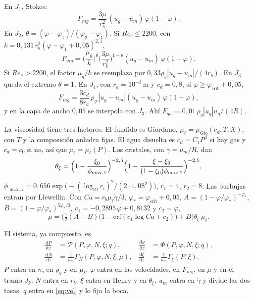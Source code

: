 \documentclass[11pt,a4paper]{article}
\newcommand{\dd}{\,\mathrm{d}}
\begin{document}
En $J_1$, Stokes:
\begin{equation}
\label{eq:Fmg1}
F_{mg}
=\frac{3\mu}{r_b^2}\,(u_g-u_m)\,\varphi(1-\varphi).
\end{equation}
En $J_2$, $\theta=(\varphi-\varphi_1)/(\varphi_2-\varphi_1)$. Si
$Re_b\le 2200$, con
$k=0{,}131\,r_b^2(\varphi-\varphi_1+0{,}05)^{2{,}1}$,
\begin{equation}
\label{eq:Fmg2}
F_{mg}
=\Biggl(\frac{\mu_g}{k}\Biggr)^\theta
\Biggl(\frac{3\mu}{r_b^2}\Biggr)^{1-\theta}
(u_g-u_m)\,\varphi(1-\varphi).
\end{equation}
Si $Re_b>2200$, el factor $\mu_g/k$ se reemplaza por
$0{,}33\rho_g|u_g-u_m|/(4r_b)$. En $J_3$ queda el extremo
$\theta=1$. En $J_4$, con $r_a=10^{-3}\,\mathrm{m}$ y $c_d=0{,}8$,
si $\varphi\ge\varphi_{\mathrm{crit}}+0{,}05$,
\begin{equation}
\label{eq:Fmg4}
F_{mg}
=\frac{3c_d}{8r_a}\,\rho_g\,|u_g-u_m|(u_g-u_m)\,\varphi(1-\varphi),
\end{equation}
y en la capa de ancho $0{,}05$ se interpola con $J_3$. Ahí
$F_{gw}=0{,}01\,\rho_g|u_g|u_g/(4R)$.

La viscosidad tiene tres factores. El fundido es Giordano,
$\mu_\ell=\mu_{\mathrm{Gio}}(c_d,T,X)$, con $T$ y la composición
anhidra fijas. El agua disuelta es $c_d=C_1 P^\beta$ si hay gas y
$c_d=c_0$ si no, así que $\mu_\ell=\mu_\ell(P)$. Los cristales, con
$\dot\gamma=u_m/R$, dan
\begin{equation}
\label{eq:thxi}
\theta_\xi
=\Bigl(1-\frac{\xi_0}{\phi_{\max,1}}\Bigr)^{-2{,}5}
\Bigl(1-\frac{\xi-\xi_0}{(1-\xi_0)\phi_{\max,2}}\Bigr)^{-2{,}5},
\end{equation}
$\phi_{\max,i}=0{,}656\exp\bigl(-(\log_{10}r_i)^2/(2\cdot 1{,}08^2)\bigr)$,
$r_1=4$, $r_2=8$. Las burbujas entran por Llewellin. Con
$Ca=r_b\mu_\ell\dot\gamma/3$,
$\varphi_\ast=\varphi_{\mathrm{crit}}+0{,}05$,
$A=(1-\varphi/\varphi_\ast)^{-\varphi_\ast}$,
$B=(1-\varphi/\varphi_\ast)^{5\varphi_\ast/3}$,
$c_1=-0{,}2895\,\varphi+0{,}8132$ y $c_2=\varphi$,
\begin{equation}
\label{eq:mu}
\mu
=\Biggl(\tfrac12(A-B)\bigl(1-\mathrm{erf}(c_1\log Ca+c_2)\bigr)+B\Biggr)
\theta_\xi\,\mu_\ell.
\end{equation}

El sistema, ya compuesto, es
\begin{equation}
\label{eq:dae}
\begin{aligned}
\frac{\dd P}{\dd z}
&=\mathcal{P}(P,\varphi,N,\xi;q),
&
\frac{\dd\varphi}{\dd z}
&=\Phi(P,\varphi,N,\xi;q),
\\
\frac{\dd N}{\dd z}
&=\frac{1}{u_m}\Gamma_N(P,\varphi,N,\xi,\mu),
&
\frac{\dd\xi}{\dd z}
&=\frac{1}{u_m}\Gamma_\xi(P,\xi).
\end{aligned}
\end{equation}
$P$ entra en $n$, en $\rho_g$ y en $\mu_\ell$. $\varphi$ entra en las
velocidades, en $F_{mg}$, en $\mu$ y en el tramo $J_k$. $N$ entra en
$r_b$. $\xi$ entra en Henry y en $\theta_\xi$. $u_m$ entra en
$\dot\gamma$ y divide las dos tasas. $q$ entra en \eqref{eq:vel} y lo
fija la boca.
\end{document}
